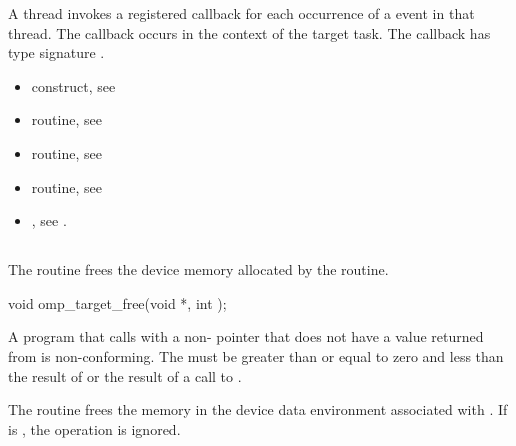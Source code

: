 \begin{ccppspecific}
\tools

A thread invokes a registered 
callback for each occurrence of a  event in that thread.
The callback occurs in the context of the target task.  The callback has type signature
.


\crossreferences
\begin{itemize}
\item {} construct, see

\item {} routine, see

\item {} routine, see

\item {} routine, see

\item {}, see
.

\end{itemize}



\subsection{}
\label{subsec:omp_target_free}
\summary
The  routine frees the device memory allocated by the  routine.

\format
\begin{ompcFunction}
void omp_target_free(void *, int );
\end{ompcFunction}

\constraints

A program that calls  with a non- pointer
that does not have a value returned from  is
non-conforming.  The  must be greater than or equal to
zero and less than the result of  or the
 result of a call to .

\effect

The  routine frees the memory in the device data
environment associated with .  If  is
, the operation is ignored.


\end{ccppspecific}
